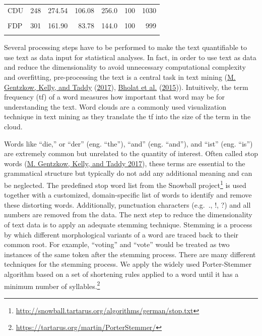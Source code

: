 \documentclass[
  12pt,
]{article}
\begin{document}
\begin{table}[H]
\begin{tabular}[t]{lrrrrrr}
\hspace{1em}CDU & 248 & 274.54 & 106.08 & 256.0 & 100 & 1030\\
\hspace{1em}\cellcolor{gray!6}{DIE LINKE} & \cellcolor{gray!6}{686} & \cellcolor{gray!6}{200.47} & \cellcolor{gray!6}{71.78} & \cellcolor{gray!6}{190.0} & \cellcolor{gray!6}{101} & \cellcolor{gray!6}{1048}\\
\hspace{1em}FDP & 301 & 161.90 & 83.78 & 144.0 & 100 & 999\\
\hspace{1em}\cellcolor{gray!6}{SPD} & \cellcolor{gray!6}{315} & \cellcolor{gray!6}{213.41} & \cellcolor{gray!6}{56.16} & \cellcolor{gray!6}{208.0} & \cellcolor{gray!6}{103} & \cellcolor{gray!6}{429}\\
\bottomrule
\end{tabular}
\end{table}

Several processing steps have to be performed to make the text
quantifiable to use text as data input for statistical analyses. In
fact, in order to use text as data and reduce the dimensionality to
avoid unnecessary computational complexity and overfitting,
pre-processing the text is a central task in text mining
(\protect\hyperlink{ref-gentzkow_text_2017}{M. Gentzkow, Kelly, and
Taddy} (\protect\hyperlink{ref-gentzkow_text_2017}{2017}),
\protect\hyperlink{ref-bholat_text_2015}{Bholat et al.}
(\protect\hyperlink{ref-bholat_text_2015}{2015})). Intuitively, the term
frequency (tf) of a word measures how important that word may be for
understanding the text. Word clouds are a commonly used visualization
technique in text mining as they translate the tf into the size of the
term in the cloud.

Words like ``die,'' or ``der'' (eng. ``the''), ``and'' (eng. ``and''),
and ``ist'' (eng. ``is'') are extremely common but unrelated to the
quantity of interest. Often called stop words
(\protect\hyperlink{ref-gentzkow_text_2017}{M. Gentzkow, Kelly, and
Taddy 2017}), these terms are essential to the grammatical structure but
typically do not add any additional meaning and can be neglected. The
predefined stop word list from the Snowball project\footnote{\url{http://snowball.tartarus.org/algorithms/german/stop.txt}}
is used together with a customized, domain-specific list of words to
identify and remove these distorting words. Additionally, punctuation
characters (e.g.~., !, ?) and all numbers are removed from the data. The
next step to reduce the dimensionality of text data is to apply an
adequate stemming technique. Stemming is a process by which different
morphological variants of a word are traced back to their common root.
For example, ``voting'' and ``vote'' would be treated as two instances
of the same token after the stemming process. There are many different
techniques for the stemming process. We apply the widely used
Porter-Stemmer algorithm based on a set of shortening rules applied to a
word until it has a minimum number of syllables.\footnote{\url{https://tartarus.org/martin/PorterStemmer/}}
\end{document}
